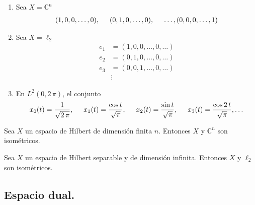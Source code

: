 \begin{enumerate}
\item Sea $X = \mathbb{C}^{n}$
\begin{align*} (1, 0, 0, \ldots, 0), \hspace{0.5cm} (0, 1, 0, \ldots, 0), \hspace{0.5cm} \ldots, (0, 0, 0, \ldots, 1) \end{align*}
\item Sea $X = \ell_{2}$
\begin{align*}
e_{1} &=  (1, 0, 0, \ldots, 0, \ldots) \\
e_{2} &=  (0, 1, 0, \ldots, 0, \ldots) \\
e_{3} &=  (0, 0, 1, \ldots, 0, \ldots) \\
&{} \vdots
\end{align*}
\item En $L^{2}(0, 2 \, \pi)$, el conjunto
\begin{align*} x_{0}(t) = \dfrac{1}{\sqrt{2 \, \pi}}, \hspace{0.5cm} x_{1}(t) = \dfrac{\cos t}{\sqrt{\pi}}, \hspace{0.5cm} x_{2}(t) = \dfrac{\sin t}{\sqrt{\pi}}, \hspace{0.5cm} x_{3}(t) = \dfrac{\cos 2 \, t}{\sqrt{\pi}}, \ldots\end{align*}
\end{enumerate}
\begin{teo}
Sea $X$ un espacio de Hilbert de dimensión finita $n$. Entonces $X$ y $\mathbb{C}^{n}$ son isométricos.
\end{teo}
\begin{teo}
Sea $X$ un espacio de Hilbert separable y de dimensión infinita. Entonces $X$ y $\ell_{2}$ son isométricos.
\end{teo}

\subsection{Espacio dual.}

